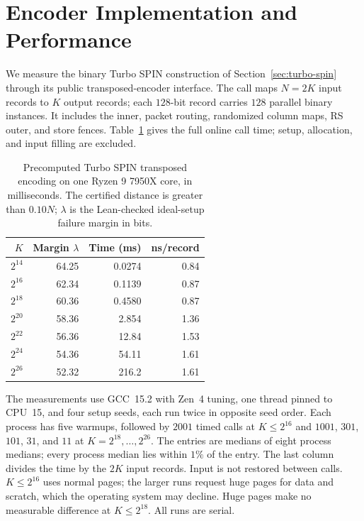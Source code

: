 \section{Encoder Implementation and Performance}
\label{sec:implementation}

We measure the binary Turbo SPIN construction of
Section~\ref{sec:turbo-spin} through its public transposed-encoder
interface. The call maps $N=2K$ input records to $K$ output records;
each $128$-bit record carries $128$ parallel binary instances. It includes
the inner, packet routing, randomized column maps, RS outer, and store
fences. Table~\ref{tab:turbo-performance} gives the full online call time;
setup, allocation, and input filling are excluded.

\begin{table}[tb]
\centering
\caption{Precomputed Turbo SPIN transposed encoding on one Ryzen 9 7950X
core, in milliseconds. The certified distance is greater than $0.10N$;
$\lambda$ is the Lean-checked ideal-setup failure margin in bits.}
\label{tab:turbo-performance}
\setlength{\tabcolsep}{9pt}
\begin{tabular}{@{}rrrr@{}}
\toprule
$K$ & Margin $\lambda$ & Time (ms) & ns/record \\
\midrule
$2^{14}$ & 64.25 & 0.0274 & 0.84 \\
$2^{16}$ & 62.34 & 0.1139 & 0.87 \\
$2^{18}$ & 60.36 & 0.4580 & 0.87 \\
$2^{20}$ & 58.36 & 2.854 & 1.36 \\
$2^{22}$ & 56.36 & 12.84 & 1.53 \\
$2^{24}$ & 54.36 & 54.11 & 1.61 \\
$2^{26}$ & 52.32 & 216.2 & 1.61 \\
\bottomrule
\end{tabular}
\end{table}

The measurements use GCC~15.2 with Zen~4 tuning, one thread pinned to
CPU~15, and four setup seeds, each run twice in opposite seed order.
Each process has five warmups, followed by $2001$ timed calls at
$K\le2^{16}$ and $1001$, $301$, $101$, $31$, and $11$ at
$K=2^{18},\ldots,2^{26}$. The entries are medians of eight process
medians; every process median lies within $1\%$ of the entry. The
last column divides the time by the $2K$ input records. Input is not
restored between calls. $K\le2^{16}$ uses normal pages; the larger runs
request huge pages for data and scratch, which the operating system may
decline. Huge pages make no measurable difference at $K\le2^{18}$. All
runs are serial.

